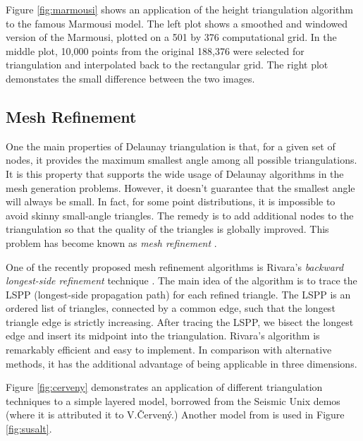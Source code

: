 
\par
Figure \ref{fig:marmousi} shows an application of the height
triangulation algorithm to the famous Marmousi model. The left plot
shows a smoothed and windowed version of the Marmousi, plotted on a
501 by 376 computational grid. In the middle plot, 10,000 points from
the original 188,376 were selected for triangulation and interpolated
back to the rectangular grid. The right plot demonstates the small
difference between the two images.

\subsection{Mesh Refinement}

One the main properties of Delaunay triangulation is that, for a
given set of nodes, it provides the maximum smallest angle among
all possible triangulations. It is this property that supports the wide
usage of Delaunay algorithms in the mesh generation problems.
However, it doesn't guarantee that the smallest angle will always be small.
In fact, for some point distributions, it is impossible to avoid
skinny small-angle triangles. The remedy is to add additional
nodes to the triangulation so that the quality of the triangles is
globally improved. This problem has become known as
\emph{mesh refinement} \cite[]{ruppert}.

\par
One of the recently proposed mesh refinement algorithms is Rivara's
\emph{backward longest-side refinement} technique \cite[]{rivara}.  The
main idea of the algorithm is to trace the LSPP (longest-side
propagation path) for each refined triangle. The LSPP is an ordered
list of triangles, connected by a common edge, such that the longest
triangle edge is strictly increasing. After tracing the LSPP, we
bisect the longest edge and insert its midpoint into the
triangulation. Rivara's algorithm is remarkably efficient and easy to
implement. In comparison with alternative methods, it has the
additional advantage of being applicable in three dimensions.
\par
Figure \ref{fig:cerveny} demonstrates an application of different
triangulation techniques to a simple layered model, borrowed from the
Seismic Unix demos (where it is attributed it to V.\v{C}erven\'{y}.)
Another model from \cite{hale} is used in Figure \ref{fig:susalt}.

